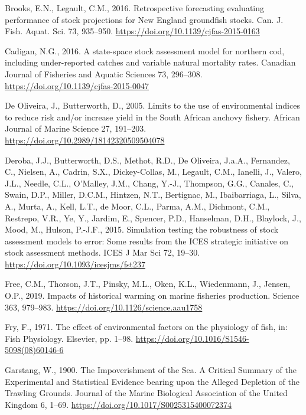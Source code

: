 \documentclass[]{article}
\begin{document}
\leavevmode\hypertarget{ref-brooks2016Retrospective}{}%
Brooks, E.N., Legault, C.M., 2016. Retrospective forecasting evaluating
performance of stock projections for New England groundfish stocks. Can.
J. Fish. Aquat. Sci. 73, 935--950.
\url{https://doi.org/10.1139/cjfas-2015-0163}

\leavevmode\hypertarget{ref-cadigan2016Statespace}{}%
Cadigan, N.G., 2016. A state-space stock assessment model for northern
cod, including under-reported catches and variable natural mortality
rates. Canadian Journal of Fisheries and Aquatic Sciences 73, 296--308.
\url{https://doi.org/10.1139/cjfas-2015-0047}

\leavevmode\hypertarget{ref-deoliveira2005Limits}{}%
De Oliveira, J., Butterworth, D., 2005. Limits to the use of
environmental indices to reduce risk and/or increase yield in the South
African anchovy fishery. African Journal of Marine Science 27, 191--203.
\url{https://doi.org/10.2989/18142320509504078}

\leavevmode\hypertarget{ref-deroba2015Simulation}{}%
Deroba, J.J., Butterworth, D.S., Methot, R.D., De Oliveira, J.a.A.,
Fernandez, C., Nielsen, A., Cadrin, S.X., Dickey-Collas, M., Legault,
C.M., Ianelli, J., Valero, J.L., Needle, C.L., O'Malley, J.M., Chang,
Y.-J., Thompson, G.G., Canales, C., Swain, D.P., Miller, D.C.M.,
Hintzen, N.T., Bertignac, M., Ibaibarriaga, L., Silva, A., Murta, A.,
Kell, L.T., de Moor, C.L., Parma, A.M., Dichmont, C.M., Restrepo, V.R.,
Ye, Y., Jardim, E., Spencer, P.D., Hanselman, D.H., Blaylock, J., Mood,
M., Hulson, P.-J.F., 2015. Simulation testing the robustness of stock
assessment models to error: Some results from the ICES strategic
initiative on stock assessment methods. ICES J Mar Sci 72, 19--30.
\url{https://doi.org/10.1093/icesjms/fst237}

\leavevmode\hypertarget{ref-free2019Impacts}{}%
Free, C.M., Thorson, J.T., Pinsky, M.L., Oken, K.L., Wiedenmann, J.,
Jensen, O.P., 2019. Impacts of historical warming on marine fisheries
production. Science 363, 979--983.
\url{https://doi.org/10.1126/science.aau1758}

\leavevmode\hypertarget{ref-fry1971Effect}{}%
Fry, F., 1971. The effect of environmental factors on the physiology of
fish, in: Fish Physiology. Elsevier, pp. 1--98.
\url{https://doi.org/10.1016/S1546-5098(08)60146-6}

\leavevmode\hypertarget{ref-garstang1900Impoverishment}{}%
Garstang, W., 1900. The Impoverishment of the Sea. A Critical Summary of
the Experimental and Statistical Evidence bearing upon the Alleged
Depletion of the Trawling Grounds. Journal of the Marine Biological
Association of the United Kingdom 6, 1--69.
\url{https://doi.org/10.1017/S0025315400072374}
\end{document}
